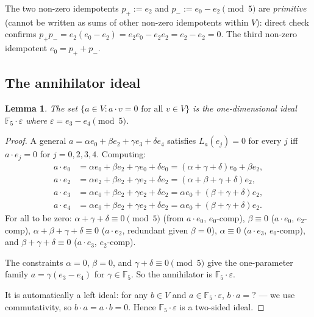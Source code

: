 \documentclass[11pt,reqno]{amsart}
\theoremstyle{plain}
\newtheorem{lemma}[theorem]{Lemma}
\theoremstyle{definition}
\theoremstyle{remark}
\newcommand{\F}{\mathbb{F}}
\begin{document}
The two non-zero idempotents $p_+ := e_2$ and $p_- := e_0 - e_2 \pmod 5$ are \emph{primitive} (cannot be written as sums of other non-zero idempotents within $V$): direct check confirms $p_+ p_- = e_2 (e_0 - e_2) = e_2 e_0 - e_2 e_2 = e_2 - e_2 = 0$. The third non-zero idempotent $e_0 = p_+ + p_-$.

\subsection{The annihilator ideal}

\begin{lemma} \label{lem:ann}
The set $\{a \in V : a \cdot v = 0 \text{ for all } v \in V\}$ is the one-dimensional ideal $\F_5 \cdot \varepsilon$ where $\varepsilon = e_3 - e_4 \pmod 5$.
\end{lemma}

\begin{proof}
A general $a = \alpha e_0 + \beta e_2 + \gamma e_3 + \delta e_4$ satisfies $L_a(e_j) = 0$ for every $j$ iff $a \cdot e_j = 0$ for $j = 0, 2, 3, 4$. Computing:
\begin{align*}
a \cdot e_0 &= \alpha e_0 + \beta e_2 + \gamma e_0 + \delta e_0 = (\alpha + \gamma + \delta) e_0 + \beta e_2,\\
a \cdot e_2 &= \alpha e_2 + \beta e_2 + \gamma e_2 + \delta e_2 = (\alpha + \beta + \gamma + \delta) e_2,\\
a \cdot e_3 &= \alpha e_0 + \beta e_2 + \gamma e_2 + \delta e_2 = \alpha e_0 + (\beta + \gamma + \delta) e_2,\\
a \cdot e_4 &= \alpha e_0 + \beta e_2 + \gamma e_2 + \delta e_2 = \alpha e_0 + (\beta + \gamma + \delta) e_2.
\end{align*}
For all to be zero: $\alpha + \gamma + \delta \equiv 0 \pmod 5$ (from $a \cdot e_0$, $e_0$-comp), $\beta \equiv 0$ ($a \cdot e_0$, $e_2$-comp), $\alpha + \beta + \gamma + \delta \equiv 0$ ($a \cdot e_2$, redundant given $\beta = 0$), $\alpha \equiv 0$ ($a \cdot e_3$, $e_0$-comp), and $\beta + \gamma + \delta \equiv 0$ ($a \cdot e_3$, $e_2$-comp).

The constraints $\alpha = 0$, $\beta = 0$, and $\gamma + \delta \equiv 0 \pmod 5$ give the one-parameter family $a = \gamma(e_3 - e_4)$ for $\gamma \in \F_5$. So the annihilator is $\F_5 \cdot \varepsilon$.

It is automatically a left ideal: for any $b \in V$ and $a \in \F_5 \cdot \varepsilon$, $b \cdot a = ?$ — we use commutativity, so $b \cdot a = a \cdot b = 0$. Hence $\F_5 \cdot \varepsilon$ is a two-sided ideal.
\end{proof}
\end{document}
